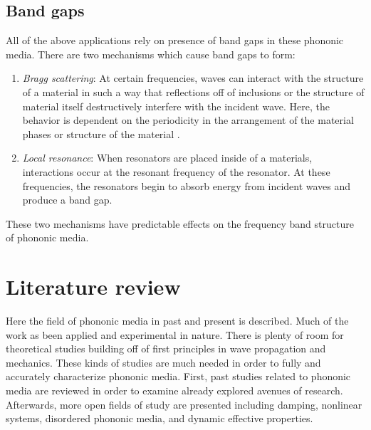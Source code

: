 \documentclass{article}
\begin{document}
\subsection{Band gaps}
All of the above applications rely on presence of band gaps in these phononic 
media. There are two mechanisms which cause band gaps to form:
\begin{enumerate}
	\item \emph{Bragg scattering}: At certain frequencies, waves can interact 
	with the structure of a material in such a way that reflections off of 
	inclusions or the structure of material itself destructively interfere with 
	the incident wave. Here, the behavior is dependent on the periodicity in 
	the arrangement of the material phases or structure of the material 
	\cite{laude15}.
	\item \emph{Local resonance}: When resonators are placed inside of a 
	materials, interactions occur at the resonant frequency of the resonator. 
	At these frequencies, the resonators begin to absorb energy from incident 
	waves and produce a band gap.
\end{enumerate}
These two mechanisms have predictable effects on the frequency band structure 
of phononic media. 


\section{Literature review}
Here the field of phononic media in past and present is described. Much of the 
work as been applied and experimental in nature. There is plenty of room for 
theoretical studies building off of first principles in wave propagation and 
mechanics. These kinds of studies are much needed in order to fully and 
accurately characterize phononic media. First, past studies related to phononic 
media are reviewed in order to examine already explored avenues of research. 
Afterwards, more open fields of study are presented including damping, 
nonlinear systems, disordered phononic media, and dynamic effective properties.
\end{document}
